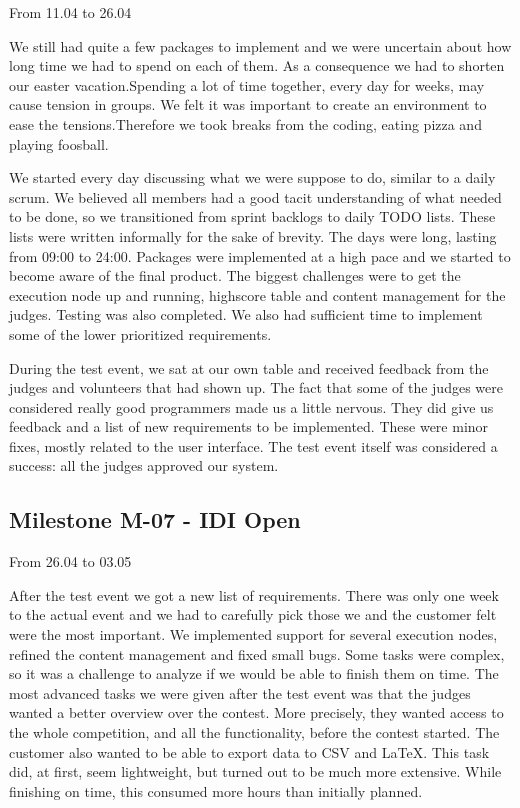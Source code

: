 From 11.04 to 26.04

We still had quite a few packages to implement and we were uncertain
about how long time we had to spend on each of them. As a consequence
we had to shorten our easter vacation.Spending a lot of time together,
every day for weeks, may cause tension in groups. We felt it was
important to create an environment to ease the tensions.Therefore we
took breaks from the coding, eating pizza and playing foosball. 




We started every day discussing what we were suppose to do, similar to a
daily scrum. We believed all members had a good tacit understanding of
what needed to be done, so we transitioned from sprint backlogs to
daily TODO lists. These lists were written informally for the sake of
brevity.\newline
\newline
The days were long, lasting from 09:00 to 24:00. Packages were
implemented at a high pace and we started to become aware of the final
product. The biggest challenges were to get the execution node up and
running, highscore table and content management for the judges. Testing
was also completed. We also had sufficient time to implement some of
the lower prioritized requirements. 




During the test event, we sat at our own table and received feedback
from the judges and volunteers that had shown up. The fact that some of
the judges were considered really good programmers made us a little
nervous. They did give us feedback and a list of new requirements to be
implemented. These were minor fixes, mostly related to the user
interface. The test event itself was considered a success: all the
judges approved our system.




\subsection{Milestone M-07 - IDI Open}

From 26.04 to 03.05

After the test event we got a new list of requirements. There was only
one week to the actual event and we had to carefully pick those we and
the customer felt were the most important. We implemented support for
several execution nodes, refined the content management and fixed small
bugs. Some tasks were complex, so it was a challenge to analyze if we
would be able to finish them on time. The most advanced tasks we were
given after the test event was that the judges wanted a better overview
over the contest. More precisely, they wanted access to the whole
competition, and all the functionality, before the contest started. The
customer also wanted to be able to export data to CSV and LaTeX. This
task did, at first, seem lightweight, but turned out to be much more
extensive. While finishing on time, this consumed more hours than
initially planned.




